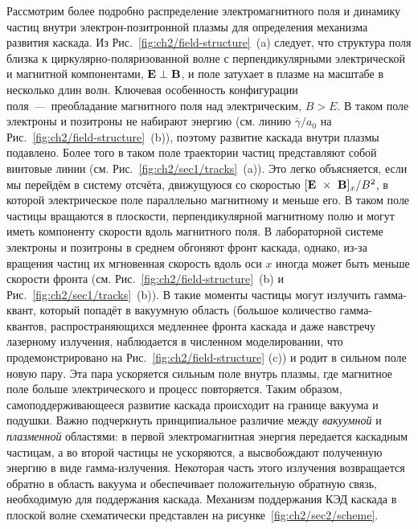Рассмотрим более подробно распределение электромагнитного поля и динамику частиц внутри электрон-позитронной плазмы для определения механизма развития каскада. 
Из Рис.~\ref{fig:ch2/field-structure}~(a) следует, что структура поля близка к циркулярно-поляризованной волне с перпендикулярными электрической и магнитной компонентами, $\vb{E \perp B}$, и поле затухает в плазме на масштабе в несколько длин волн. 
Ключевая особенность конфигурации поля~---~преобладание магнитного поля над электрическим, $B > E$.
В таком поле электроны и позитроны не набирают энергию (см. линию $\overline{\gamma} / a_0$ на  Рис.~\ref{fig:ch2/field-structure}~(b)), поэтому развитие каскада внутри плазмы подавлено.
Более того в таком поле траектории частиц представляют собой винтовые линии (см. Рис.~\ref{fig:ch2/sec1/tracks}~(a)). 
Это легко объясняется, если мы перейдём в систему отсчёта, движущуюся со скоростью $[\vb{E}~\times~\vb{B}]_x / B^2$, в которой электрическое поле параллельно магнитному и меньше его. 
В таком поле частицы вращаются в плоскости, перпендикулярной магнитному полю и могут иметь компоненту скорости вдоль магнитного поля. 
В лабораторной системе электроны и позитроны в среднем обгоняют фронт каскада, однако, из-за вращения частиц их мгновенная скорость вдоль оси $x$ иногда может быть меньше скорости фронта (см.  Рис.~\ref{fig:ch2/field-structure}~(b) и Рис.~\ref{fig:ch2/sec1/tracks}~(b)). 
В такие моменты частицы могут излучить гамма-квант, который попадёт в вакуумную область (большое количество гамма-квантов, распространяющихся медленнее фронта каскада и даже навстречу лазерному излучения, наблюдается в численном моделировании, что продемонстрировано на Рис.~\ref{fig:ch2/field-structure} (c)) и родит в сильном поле новую пару. 
Эта пара ускоряется сильным поле внутрь плазмы, где магнитное поле больше электрического и процесс повторяется.
Таким образом, самоподдерживающееся развитие каскада происходит на границе вакуума и подушки.
Важно подчеркнуть принципиальное различие между \textit{вакуумной} и \textit{плазменной} областями: в первой электромагнитная энергия передается каскадным частицам, а во второй частицы не ускоряются, а высвобождают полученную энергию в виде гамма-излучения.
Некоторая часть этого излучения возвращается обратно в область вакуума и обеспечивает положительную обратную связь, необходимую для поддержания каскада.
Механизм поддержания КЭД каскада в плоской волне схематически представлен на рисунке~\ref{fig:ch2/sec2/scheme}.



